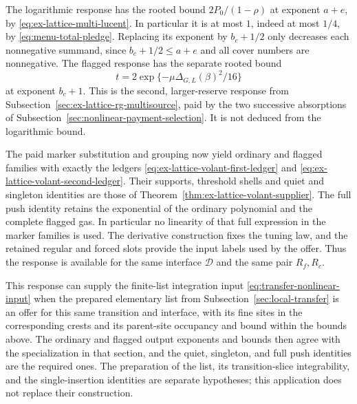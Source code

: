 The logarithmic response has the rooted bound
$2P_0/(1-\rho)$ at exponent $a+e$, by
\eqref{eq:ex-lattice-multi-lucent}. In particular it is at most $1$,
indeed at most $1/4$, by \eqref{eq:menu-total-pledge}.
Replacing its exponent by $b_c+1/2$ only decreases each nonnegative
summand, since $b_c+1/2\le a+e$ and all cover numbers are nonnegative.
The flagged response has the separate rooted bound
\[
                  t=2\exp\{-\mu\Delta_{G,L}(\beta)^2/16\}
\]
at exponent $b_c+1$. This is the second, larger-reserve response from
Subsection~\ref{sec:ex-lattice-rg-multisource}, paid by the two successive
absorptions of Subsection~\ref{sec:nonlinear-payment-selection}.
It is not deduced from the logarithmic bound.

The paid marker substitution and grouping now yield ordinary and flagged
families with exactly the ledgers
\eqref{eq:ex-lattice-volant-first-ledger} and
\eqref{eq:ex-lattice-volant-second-ledger}. Their supports, threshold
shells and quiet and singleton identities are those of
Theorem~\ref{thm:ex-lattice-volant-supplier}. The full push identity
retains the exponential of the ordinary polynomial and the complete
flagged gas. In particular no linearity of that full expression in the
marker families is used. The derivative construction fixes the tuning
law, and the retained regular and forced slots provide the input labels
used by the offer. Thus the response is available for the same interface
$\mathcal D$ and the same pair $R_f,R_c$.

This response can supply the finite-list integration input
\eqref{eq:transfer-nonlinear-input} when the prepared elementary list from
Subsection~\ref{sec:local-transfer} is an offer for this same transition and
interface, with its fine sites in the corresponding crests and its parent-site
occupancy and bound within the bounds above. The ordinary and flagged output
exponents and bounds then agree with the specialization in that section, and
the quiet, singleton, and full push identities are the required ones. The
preparation of the list, its transition-slice integrability, and the
single-insertion identities are separate hypotheses; this application does
not replace their construction.

